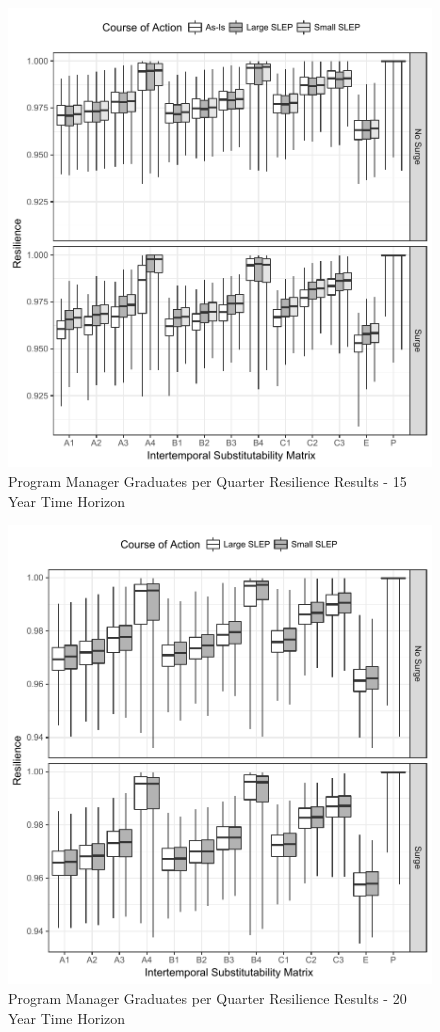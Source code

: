\documentclass[preprint,12pt]{elsarticle}
\begin{document}
\begin{figure}[h]
  \centering\includegraphics{PMGradAllChiPlotTimeHorizon15}
  \caption{Program Manager Graduates per Quarter Resilience Results  - 15 Year Time Horizon}
  \label{f:PMresultsGradAllChi15}
\end{figure}


\begin{figure}[h]
  \centering\includegraphics{PMGradAllChiPlotTimeHorizon20}
  \caption{Program Manager Graduates per Quarter Resilience Results  - 20 Year Time Horizon}
  \label{f:PMresultsGradAllChi20}
\end{figure}
\end{document}
